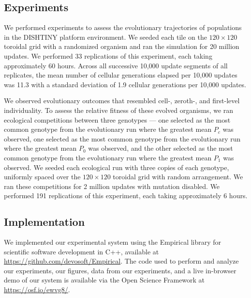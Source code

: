 \subsection{Experiments}

We performed experiments to assess the evolutionary trajectories of populations in the DISHTINY platform environment.
We seeded each tile on the $120 \times 120$ toroidal grid with a randomized organism and ran the simulation for 20 million updates.
We performed 33 replications of this experiment, each taking approximately 60 hours.
Across all successive 10,000 update segments of all replicates, the mean number of cellular generations elapsed per 10,000 updates was 11.3 with a standard deviation of 1.9 cellular generations per 10,000 updates.

We observed evolutionary outcomes that resembled cell-, zeroth-, and first-level individuality.
To assess the relative fitness of these evolved organisms, we ran ecological competitions between three genotypes --- one selected as the most common genotype from the evolutionary run where the greatest mean $P_{c}$ was observed, one selected as the most common genotype from the evolutionary run where the greatest mean $P_0$ was observed, and the other selected as the most common genotype from the evolutionary run where the greatest mean $P_1$ was observed.
We seeded each ecological run with three copies of each genotype, uniformly spaced over the $120 \times 120$ toroidal grid with random arrangement.
We ran these competitions for 2 million updates with mutation disabled.
We performed 191 replications of this experiment, each taking approximately 6 hours.

\subsection{Implementation}

We implemented our experimental system using the Empirical library for scientific software development in C++, available at \url{https://github.com/devosoft/Empirical}.  The code used to perform and analyze our experiments, our figures, data from our experiments, and a live in-browser demo of our system is available via the Open Science Framework at \url{https://osf.io/ewvg8/}.
